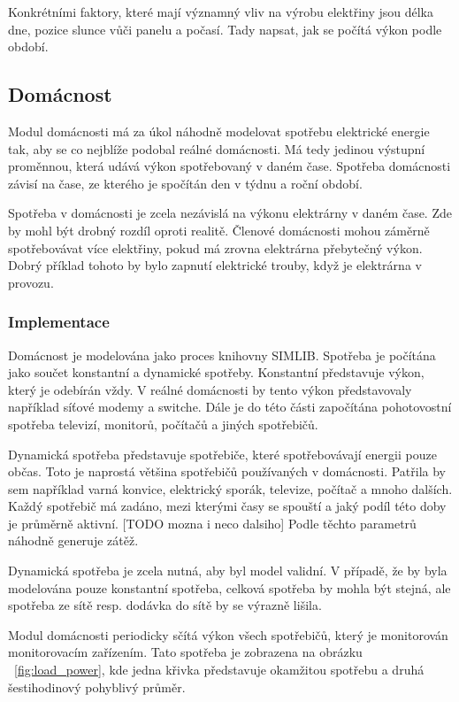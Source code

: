 \documentclass[12pt,a4paper]{article}
\begin{document}
Konkrétními faktory, které mají významný vliv na výrobu elektřiny jsou délka dne, pozice slunce vůči panelu a počasí.
Tady napsat, jak se počítá výkon podle období.


\subsection{Domácnost}
Modul domácnosti má za úkol náhodně modelovat spotřebu elektrické energie tak,
aby se co nejblíže podobal reálné domácnosti.
Má tedy jedinou výstupní proměnnou, která udává výkon spotřebovaný v daném čase.
Spotřeba domácnosti závisí na čase, ze kterého je spočítán den v týdnu a roční období.

Spotřeba v domácnosti je zcela nezávislá na výkonu elektrárny v daném čase.
Zde by mohl být drobný rozdíl oproti realitě.
Členové domácnosti mohou záměrně spotřebovávat více elektřiny, pokud má zrovna elektrárna přebytečný výkon.
Dobrý příklad tohoto by bylo zapnutí elektrické trouby, když je elektrárna v provozu.

\subsubsection{Implementace}
Domácnost je modelována jako proces knihovny SIMLIB.
Spotřeba je počítána jako součet konstantní a dynamické spotřeby.
Konstantní představuje výkon, který je odebírán vždy.
V reálné domácnosti by tento výkon představovaly například síťové modemy a switche.
Dále je do této části započítána pohotovostní spotřeba televizí, monitorů, počítačů a jiných spotřebičů.

Dynamická spotřeba představuje spotřebiče, které spotřebovávají energii pouze občas.
Toto je naprostá většina spotřebičů používaných v domácnosti.
Patřila by sem například varná konvice, elektrický sporák, televize, počítač a mnoho dalších.
Každý spotřebič má zadáno, mezi kterými časy se spouští a jaký podíl této doby je průměrně aktivní. [TODO mozna i neco dalsiho]
Podle těchto parametrů náhodně generuje zátěž.

Dynamická spotřeba je zcela nutná, aby byl model validní.
V případě, že by byla modelována pouze konstantní spotřeba,
celková spotřeba by mohla být stejná, ale spotřeba ze sítě resp. dodávka do sítě by se výrazně lišila.

Modul domácnosti periodicky sčítá výkon všech spotřebičů, který je monitorován monitorovacím zařízením.
Tato spotřeba je zobrazena na obrázku ~\ref{fig:load_power},
kde jedna křivka představuje okamžitou spotřebu a druhá šestihodinový pohyblivý průměr.
\end{document}

